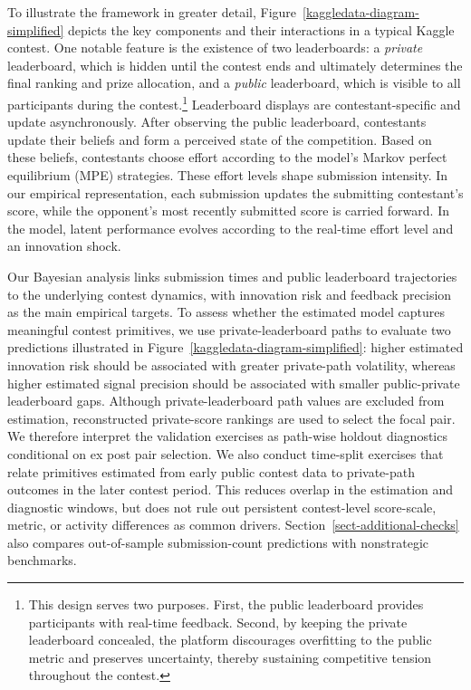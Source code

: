 \documentclass[mnsc]{informs3}
\begin{document}
To illustrate the framework in greater detail, Figure~\ref{kaggledata-diagram-simplified} depicts the key components and their interactions in a typical Kaggle contest.
One notable feature is the existence of two leaderboards: a \textit{private} leaderboard, which is hidden until the contest ends and ultimately determines the final ranking and prize allocation, and a \textit{public} leaderboard, which is visible to all participants during the contest.\footnote{
This design serves two purposes.
First, the public leaderboard provides participants with real-time feedback.
Second, by keeping the private leaderboard concealed, the platform discourages overfitting to the public metric \citep[see also][]{blum2015ladder} and preserves uncertainty, thereby sustaining competitive tension throughout the contest.
}
Leaderboard displays are contestant-specific and update asynchronously.
After observing the public leaderboard, contestants update their beliefs and form a perceived state of the competition.
Based on these beliefs, contestants choose effort according to the model’s Markov perfect equilibrium (MPE) strategies.
These effort levels shape submission intensity. 
In our empirical representation, each submission updates the submitting contestant's score, while the opponent's most recently submitted score is carried forward.
In the model, latent performance evolves according to the real-time effort level and an innovation shock.


Our Bayesian analysis links submission times and public leaderboard trajectories to the underlying contest dynamics, with innovation risk and feedback precision as the main empirical targets.
To assess whether the estimated model captures meaningful contest primitives, we use private-leaderboard paths to evaluate two predictions illustrated in Figure~\ref{kaggledata-diagram-simplified}: 
higher estimated innovation risk should be associated with greater private-path volatility, 
whereas higher estimated signal precision should be associated with smaller public-private leaderboard gaps. 
Although private-leaderboard path values are excluded from estimation, reconstructed private-score rankings are used to select the focal pair. We therefore interpret the validation exercises as path-wise holdout diagnostics conditional on ex post pair selection.
We also conduct time-split exercises that relate primitives estimated from early public contest data to private-path outcomes in the later contest period. This reduces overlap in the estimation and diagnostic windows, but does not rule out persistent contest-level score-scale, metric, or activity differences as common drivers. Section~\ref{sect-additional-checks} also compares out-of-sample submission-count predictions with nonstrategic benchmarks.
\end{document}
